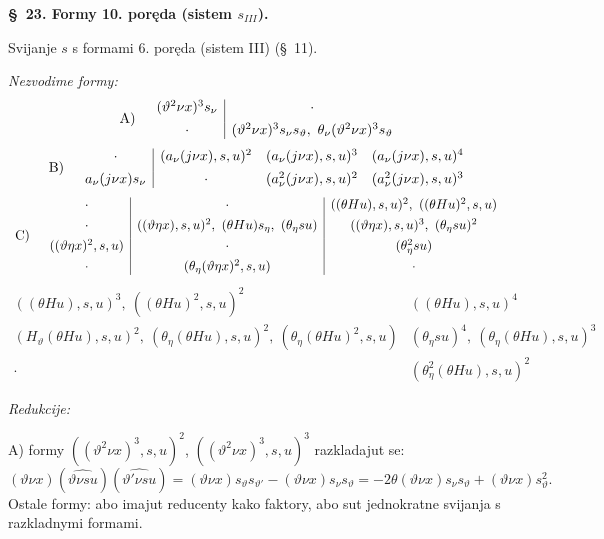 \documentclass[11pt]{article}
\begin{document}
\begin{center}
\textbf{\S\ 23. \quad Formy 10. poręda (sistem $s_{III}$).}
\end{center}

Svijanje $s$ s formami 6. poręda (sistem III) (\S\ 11).

\noindent\textit{Nezvodime formy:}
\[
\begin{array}{r@{\quad}c}
\text{A)}&
\begin{array}{c|c}
(\vartheta^2\nu x)^3s_{\nu}&\cdot\\[0.45em]
\cdot&(\vartheta^2\nu x)^3s_{\nu}s_\vartheta,\ \theta_{\nu}(\vartheta^2\nu x)^3s_\vartheta
\end{array}
\end{array}
\]
\[
\begin{array}{r@{\quad}c}
\text{B)}&
\begin{array}{c|ccc}
\cdot&(a_{\nu}(j\nu x),s,u)^2&(a_{\nu}(j\nu x),s,u)^3&(a_{\nu}(j\nu x),s,u)^4\\[0.45em]
a_{\nu}(j\nu x)s_{\nu}&\cdot&(a_{\nu}^2(j\nu x),s,u)^2&(a_{\nu}^2(j\nu x),s,u)^3
\end{array}
\end{array}
\]
\[
\begin{array}{r@{\quad}c}
\text{C)}&
\begin{array}{c|c|c}
\cdot&\cdot&((\theta Hu),s,u)^2,\ ((\theta Hu)^2,s,u)\\[0.35em]
\cdot&((\vartheta\eta x),s,u)^2,\ (\theta Hu)s_\eta,\ (\theta_\eta su)&((\vartheta\eta x),s,u)^3,\ (\theta_\eta su)^2\\[0.35em]
((\vartheta\eta x)^2,s,u)&\cdot&(\theta_\eta^2su)\\[0.35em]
\cdot&(\theta_\eta(\vartheta\eta x)^2,s,u)&\cdot
\end{array}
\end{array}
\]
\[
\begin{array}{c|c}
((\theta Hu),s,u)^3,\ ((\theta Hu)^2,s,u)^2&((\theta Hu),s,u)^4\\[0.45em]
(H_\vartheta(\theta Hu),s,u)^2,\ (\theta_\eta(\theta Hu),s,u)^2,\ (\theta_\eta(\theta Hu)^2,s,u)&(\theta_\eta su)^4,\ (\theta_\eta(\theta Hu),s,u)^3\\[0.45em]
\cdot&(\theta_\eta^2(\theta Hu),s,u)^2
\end{array}
\]

\noindent\textit{Redukcije:}

A) formy $((\vartheta^2\nu x)^3,s,u)^2$, $((\vartheta^2\nu x)^3,s,u)^3$ razkladajut se:
\[
(\vartheta\nu x)(\widehat{\vartheta\nu su})(\widehat{\vartheta'\nu su})
=(\vartheta\nu x)s_\vartheta s_{\vartheta'}-(\vartheta\nu x)s_{\nu}s_\vartheta
=-2\theta(\vartheta\nu x)s_{\nu}s_\vartheta+(\vartheta\nu x)s_\vartheta^2.
\]
Ostale formy: abo imajut reducenty kako faktory, abo sut jednokratne svijanja s razkladnymi formami.
\end{document}

